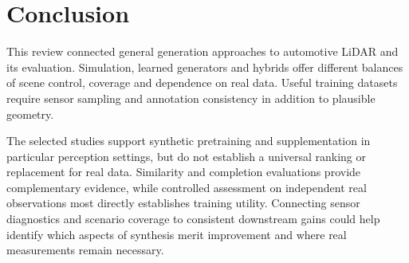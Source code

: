 \section{Conclusion}
\label{sec:conclusion}

This review connected general generation approaches to automotive LiDAR
and its evaluation. Simulation, learned generators and hybrids offer
different balances of scene control, coverage and dependence on real data.
Useful training datasets require sensor sampling and annotation consistency
in addition to plausible geometry.

The selected studies support synthetic pretraining and supplementation in
particular perception settings, but do not establish a universal ranking
or replacement for real data. Similarity and completion evaluations provide
complementary evidence, while controlled assessment on independent real
observations most directly establishes training utility. Connecting sensor
diagnostics and scenario coverage to consistent downstream gains could
help identify which aspects of synthesis merit improvement and where real
measurements remain necessary.
